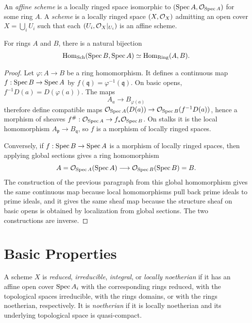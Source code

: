 \begin{definition}
An \emph{affine scheme} is a locally ringed space isomorphic to
\((\operatorname{Spec} A,\mathcal{O}_{\operatorname{Spec} A})\) for some ring \(A\).  A \emph{scheme} is a locally
ringed space \((X,\mathcal{O}_X)\) admitting an open cover \(X=\bigcup_i U_i\) such
that each \((U_i,\mathcal{O}_X|_{U_i})\) is an affine scheme.
\end{definition}

\begin{proposition}
For rings \(A\) and \(B\), there is a natural bijection
\[
    \operatorname{Hom}_{\mathrm{Sch}}(\operatorname{Spec} B,\operatorname{Spec} A)\simeq \operatorname{Hom}_{\mathrm{Ring}}(A,B).
\]
\end{proposition}

\begin{proof}
Let \(\varphi:A\to B\) be a ring homomorphism.  It defines a continuous map
\(f:\operatorname{Spec} B\to\operatorname{Spec} A\) by \(f(\mathfrak q)=\varphi^{-1}(\mathfrak q)\).  On
basic opens, \(f^{-1}D(a)=D(\varphi(a))\).  The maps
\[
    A_a\longrightarrow B_{\varphi(a)}
\]
therefore define compatible maps
\(\mathcal{O}_{\operatorname{Spec} A}(D(a))\to\mathcal{O}_{\operatorname{Spec} B}(f^{-1}D(a))\), hence a morphism of
sheaves \(f^\#:\mathcal{O}_{\operatorname{Spec} A}\to f_*\mathcal{O}_{\operatorname{Spec} B}\).  On stalks it is the local
homomorphism \(A_{\mathfrak p}\to B_{\mathfrak q}\), so \(f\) is a morphism of
locally ringed spaces.

Conversely, if \(f:\operatorname{Spec} B\to\operatorname{Spec} A\) is a morphism of locally ringed spaces,
then applying global sections gives a ring homomorphism
\[
    A=\mathcal{O}_{\operatorname{Spec} A}(\operatorname{Spec} A)\longrightarrow
    \mathcal{O}_{\operatorname{Spec} B}(\operatorname{Spec} B)=B.
\]
The construction of the previous paragraph from this global homomorphism gives
the same continuous map because local homomorphisms pull back prime ideals to
prime ideals, and it gives the same sheaf map because the structure sheaf on
basic opens is obtained by localization from global sections.  The two
constructions are inverse.
\end{proof}

\section{Basic Properties}

\begin{definition}
A scheme \(X\) is \emph{reduced}, \emph{irreducible}, \emph{integral}, or
\emph{locally noetherian} if it has an affine open cover
\(\operatorname{Spec} A_i\) with the corresponding rings reduced, with the topological spaces
irreducible, with the rings domains, or with the rings noetherian,
respectively.  It is \emph{noetherian} if it is locally noetherian and its
underlying topological space is quasi-compact.
\end{definition}

